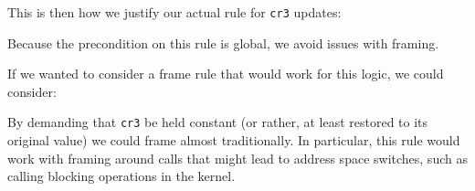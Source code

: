This is then how we justify our actual rule for \lstinline|cr3| updates:
\begin{mathpar}
\end{mathpar}
Because the precondition on this rule is global, we avoid issues with framing.

If we wanted to consider a frame rule that would work for this logic, we could consider:
\begin{mathpar}
\end{mathpar}
By demanding that \lstinline|cr3| be held constant (or rather, at least restored to its original value) we could frame almost traditionally. In particular, this rule would work with framing around calls that might lead to address space switches, such as calling blocking operations in the kernel.

